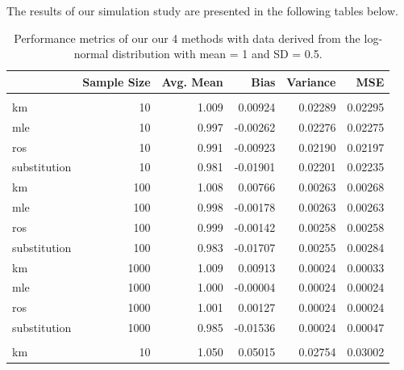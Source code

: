 \documentclass[12pt, twoside]{amherstthesis}
\begin{document}
The results of our simulation study are presented in the following tables below.
\begin{table}

\caption{\label{tab:unnamed-chunk-1}Performance metrics of our our 
             4 methods with data derived from the log-normal 
             distribution with mean = 1 and SD = 0.5.}
\centering
\fontsize{11.5}{13.5}\selectfont
\begin{tabular}[t]{lrrrrr}
\toprule
  & Sample Size & Avg. Mean & Bias & Variance & MSE\\
\midrule
\addlinespace[0.3em]
\multicolumn{6}{l}{\textbf{Censoring Rate = 0.1}}\\
\hspace{1em}km & 10 & 1.009 & 0.00924 & 0.02289 & 0.02295\\
\hspace{1em}mle & 10 & 0.997 & -0.00262 & 0.02276 & 0.02275\\
\hspace{1em}ros & 10 & 0.991 & -0.00923 & 0.02190 & 0.02197\\
\hspace{1em}substitution & 10 & 0.981 & -0.01901 & 0.02201 & 0.02235\\
\hspace{1em}km & 100 & 1.008 & 0.00766 & 0.00263 & 0.00268\\
\hspace{1em}mle & 100 & 0.998 & -0.00178 & 0.00263 & 0.00263\\
\hspace{1em}ros & 100 & 0.999 & -0.00142 & 0.00258 & 0.00258\\
\hspace{1em}substitution & 100 & 0.983 & -0.01707 & 0.00255 & 0.00284\\
\hspace{1em}km & 1000 & 1.009 & 0.00913 & 0.00024 & 0.00033\\
\hspace{1em}mle & 1000 & 1.000 & -0.00004 & 0.00024 & 0.00024\\
\hspace{1em}ros & 1000 & 1.001 & 0.00127 & 0.00024 & 0.00024\\
\hspace{1em}substitution & 1000 & 0.985 & -0.01536 & 0.00024 & 0.00047\\
\addlinespace[1em]
\multicolumn{6}{l}{\textbf{Censoring Rate = 0.3}}\\
\hspace{1em}km & 10 & 1.050 & 0.05015 & 0.02754 & 0.03002\\

\end{tabular}
\end{table}
\end{document}
